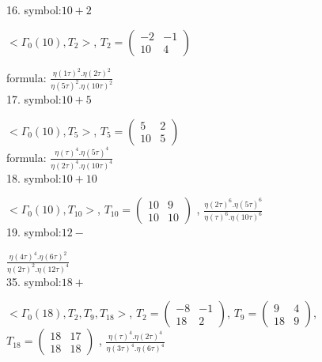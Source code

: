 

16. symbol:$ 10+2 $

$ < \Gamma_0 ( 10 ), T_2 >  $,
$
T_2 = 
\left(
\begin{array}{cc}
-2 & -1 \\
10 & 4
\end{array}
\right)
$

formula: 
$ \frac{\eta(1\tau)^2 . \eta(2\tau)^2}{\eta(5\tau)^2 . \eta(10\tau)^2} $
\\

17. symbol:$ 10+5 $

$ < \Gamma_0 ( 10 ), T_5 >  $,
$
T_5 = 
\left(
\begin{array}{cc}
5 & 2 \\
10 & 5
\end{array}
\right)
$
\\

formula: 
{$ \frac{\eta(\tau)^4 . \eta(5\tau)^4}{\eta(2\tau)^4 . \eta(10\tau)^4} $}
\\

18. symbol:$ 10+10 $

$ < \Gamma_0 ( 10 ), T_{10} >  $,
$
T_{10} = 
\left(
\begin{array}{cc}
10 & 9 \\
10 & 10
\end{array}
\right)
$
, {$ \frac{\eta(2\tau)^6 . \eta(5\tau)^6 }{\eta(\tau)^6 . \eta(10\tau)^6 } $}
\\

19. symbol:$ 12- $

 {$ \frac{\eta(4\tau)^4 . \eta(6\tau)^2}{\eta(2\tau)^2 . \eta(12\tau)^4} $}
\\

35. symbol:$ 18+ $

$ < \Gamma_0 ( 18 ), T_2, T_9, T_{18} >  $,
$
T_2 = 
\left(
\begin{array}{cc}
-8 & -1 \\
18 & 2
\end{array}
\right)
$,
$
T_9 = 
\left(
\begin{array}{cc}
9 & 4 \\
18 & 9
\end{array}
\right)
$,
$
T_{18} = 
\left(
\begin{array}{cc}
18 & 17 \\
18 & 18
\end{array}
\right)
$
, {$ \frac{\eta(\tau)^4 . \eta(2\tau)^4}{\eta(3\tau)^4 . \eta(6\tau)^4} $}
\\

